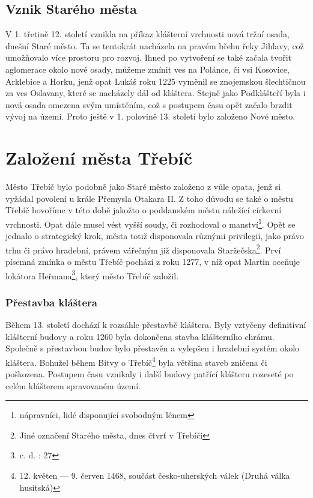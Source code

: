 \documentclass[a4paper,oneside,12p]{report}
\begin{document}
\subsection{Vznik Starého města}
V 1. třetině 12. století vznikla na příkaz klášterní vrchnosti nová tržní osada, dnešní Staré město.
Ta se tentokrát nacházela na pravém břehu řeky Jihlavy, což umožňovalo více prostoru pro rozvoj.
Ihned po vytvoření se také začala tvořit aglomerace okolo nové osady, můžeme zmínit ves na Polánce, či vsi Kosovice, Arklebice a Horku, jenž opat Lukáš roku 1225 vyměnil se znojemskou šlechtičnou za ves Oslavany, které se nacházely dál od kláštera.
Stejně jako Podklášteří byla i nová osada omezena svým umístěním, což s postupem času opět začalo brzdit vývoj na území.
Proto ještě v 1. polovině 13. století bylo založeno Nové město.


\section{Založení města Třebíč}
Město Třebíč bylo podobně jako Staré město založeno z vůle opata, jenž si vyžádal povolení u krále Přemysla Otakara II.
Z toho důvodu se také o městu Třebíč hovoříme v této době jakožto o poddanském městu náležící církevní vrchnosti.
Opat dále musel vést vyšší soudy, či rozhodoval o manství\footnote{nápravníci, lidé disponující svobodným lénem}.
Opět se jednalo o strategický krok, města totiž disponovala různými privilegii, jako právo trhu či právo hradební, právem vářečným již disponovala Staržečska\footnote{Jiné označení Starého města, dnes čtvrť v Třebíči}.
Prví písemná zmínka o městu Třebíč pochází z roku 1277, v níž opat Martin oceňuje lokátora Heřmana\footnote{c. d. : 27}, který město Třebíč založil.

\subsubsection{Přestavba kláštera}

Během 13. století dochází k rozsáhle přestavbě kláštera.
Byly vztyčeny definitivní klášterní budovy a roku 1260 byla dokončena stavba klášterního chrámu.
Společně s přestavbou budov bylo přestavěn a vylepšen i hradební systém okolo kláštera.
Bohužel během Bitvy o Třebíč\footnote{12. květen — 9. červen 1468, součást česko-uherských válek (Druhá válka husitská)} byla většina staveb zničena či poškozena.
Postupem času vznikaly i další budovy patřící klášteru rozeseté po celém klášterem spravovaném území.
\end{document}
